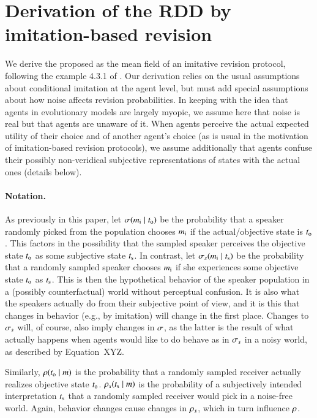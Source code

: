 \documentclass[fleqn,reqno,10pt]{article}
\newcommand{\rdd}{\acro{rdd}} %
\begin{document}
\section*{Derivation of the RDD by imitation-based revision}

We derive the proposed \rdd as the mean field of an imitative revision
protocol, following the example 4.3.1 of
\citet{Sandholm2010:Population-Game}. Our derivation relies on the
usual assumptions about conditional imitation at the agent level, but
must add special assumptions about how noise affects revision
probabilities. In keeping with the idea that agents in evolutionary
models are largely myopic, we assume here that noise is real but that
agents are unaware of it. When agents perceive the actual expected
utility of their choice and of another agent's choice (as is usual in
the motivation of imitation-based revision protocols), we assume
additionally that agents confuse their possibly non-veridical
subjective representations of states with the actual ones (details
below).

\paragraph{Notation.} As previously in this paper, let
$\sigma(m_{\mathrm{i}} \mid t_{\mathrm{o}})$ be the probability that a
speaker randomly picked from the population chooses $m_{\mathrm{i}}$ if
the actual/objective state is $t_{\mathrm{o}}$. This factors in the
possibility that the sampled speaker perceives the objective state
$t_{\mathrm{o}}$ as some subjective state $t_{\mathrm{s}}$. In contrast, let
$\sigma_s(m_{\mathrm{i}} \mid t_{\mathrm{s}})$ be the probability that
a randomly sampled speaker chooses $m_{\mathrm{i}}$ if she experiences
some objective state $t_{\mathrm{o}}$ as $t_{\mathrm{s}}$. This is then the
hypothetical behavior of the speaker population in a (possibly
counterfactual) world without perceptual confusion. It is also what
the speakers actually do from their subjective point of view, and it
is this that changes in behavior (e.g., by imitation) will change in
the first place. Changes to $\sigma_s$ will, of course, also imply
changes in $\sigma$, as the latter is the result of what actually
happens when agents would like to do behave as in $\sigma_s$ in a
noisy world, as described by Equation~XYZ.

Similarly, $\rho(t_{\mathrm{o}} \mid m)$ is the probability
that a randomly sampled receiver actually realizes objective state
$t_{\mathrm{o}}$. $\rho_s(t_{\mathrm{s}} \mid m)$ is the
probability of a subjectively intended interpretation $t_{\mathrm{s}}$
that a randomly sampled receiver would pick in a noise-free
world. Again, behavior changes cause changes in $\rho_s$, which in
turn influence $\rho$.
\end{document}
